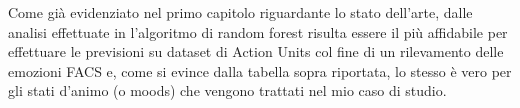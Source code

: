 Come già evidenziato nel primo capitolo riguardante lo stato dell’arte, dalle analisi effettuate in \cite{FaceExpreRecoImgSeqTwoFoldRandomForestClass} l’algoritmo di random forest risulta essere il più affidabile per effettuare le previsioni su dataset di Action Units col fine di un rilevamento delle emozioni FACS e, come si evince dalla tabella sopra riportata, lo stesso è vero per gli stati d’animo (o moods) che vengono trattati nel mio caso di studio.